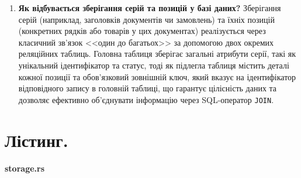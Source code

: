 \documentclass[14pt, a4paper]{extreport}
\begin{document}
\begin{enumerate}
		\item \textbf{Як відбувається зберігання серій та позицій у базі даних?} Зберігання серій (наприклад, заголовків документів чи замовлень) та їхніх позицій (конкретних рядків або товарів у цих документах) реалізується через класичний зв'язок <<один до багатьох>> за допомогою двох окремих реляційних таблиць. Головна таблиця зберігає загальні атрибути серії, такі як унікальний ідентифікатор та статус, тоді як підлегла таблиця містить деталі кожної позиції та обов'язковий зовнішній ключ, який вказує на ідентифікатор відповідного запису в головній таблиці, що гарантує цілісність даних та дозволяє ефективно об'єднувати інформацію через SQL-оператор \texttt{JOIN}.
	\end{enumerate}

	\pagebreak

	\section*{Лістинг.}

	\textbf{storage.rs}
\end{document}
